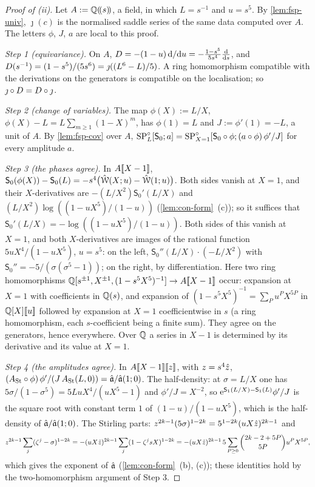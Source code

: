 
\begin{proof}[Proof of (ii)]
Let $A:=\mathbb{Q}(\!(s)\!)$, a field, in which $L=s^{-1}$ and $u=s^5$. By \cref{lem:fsp-univ}, $\jmath(c)$ is the normalised saddle series of the same data computed over $A$. The letters $\phi$, $J$, $a$ are local to this proof.

\emph{Step 1 (equivariance).} On $A$, $D=-(1-u)\,\mathrm{d}/\mathrm{d} u=-\frac{1-s^5}{5s^4}\frac{\mathrm{d}}{\mathrm{d} s}$, and $D(s^{-1})=(1-s^5)/(5s^6)=\jmath((L^6-L)/5)$. A ring homomorphism compatible with the derivations on the generators is compatible on the localisation; so $\jmath\circ D=D\circ\jmath$.

\emph{Step 2 (change of variables).} The map $\phi(X):=L/X$, $\phi(X)-L=L\sum_{m\geq1}(1-X)^m$, has $\phi(1)=L$ and $J:=\phi'(1)=-L$, a unit of $A$. By \cref{lem:fsp-cov} over $A$, $\mathrm{SP}^{\circ}_L[\mathsf S_0;a]=\mathrm{SP}^{\circ}_{X=1}[\mathsf S_0\circ\phi;(a\circ\phi)\,\phi'/J]$ for every amplitude $a$.

\emph{Step 3 (the phases agree).} In $A[\![ X-1 ]\!]$, $\mathsf S_0(\phi(X))-\mathsf S_0(L)=-s^4\bigl(\hat{\mathcal{W}}(X;u)-\hat{\mathcal{W}}(1;u)\bigr)$. Both sides vanish at $X=1$, and their $X$-derivatives are $-(L/X^2)\mathsf S_0'(L/X)$ and $(L/X^2)\log((1-uX^5)/(1-u))$ (\cref{lem:con-form}~(c)); so it suffices that $\mathsf S_0'(L/X)=-\log((1-uX^5)/(1-u))$. Both sides of this vanish at $X=1$, and both $X$-derivatives are images of the rational function $5uX^4/(1-uX^5)$, $u=s^5$: on the left, $\mathsf S_0''(L/X)\cdot(-L/X^2)$ with $\mathsf S_0''=-5/(\sigma(\sigma^5-1))$; on the right, by differentiation. Here two ring homomorphisms $\mathbb{Q}[s^{\pm1},X^{\pm1},(1-s^5X^5)^{-1}]\to A[\![ X-1 ]\!]$ occur: expansion at $X=1$ with coefficients in $\mathbb{Q}(s)$, and expansion of $(1-s^5X^5)^{-1}=\sum_Pu^PX^{5P}$ in $\mathbb{Q}[X][\![ u ]\!]$ followed by expansion at $X=1$ coefficientwise in $s$ (a ring homomorphism, each $s$-coefficient being a finite sum). They agree on the generators, hence everywhere. Over $\mathbb{Q}$ a series in $X-1$ is determined by its derivative and its value at $X=1$.

\emph{Step 4 (the amplitudes agree).} In $A[\![ X-1 ]\!][\![ z ]\!]$, with $z=s^4\hat{z}$, $(A_{\mathrm{St}}\circ\phi)\,\phi'/(J\,A_{\mathrm{St}}(L,0))=\hat{\mathfrak{a}}/\hat{\mathfrak{a}}(1;0)$. The half-density: at $\sigma=L/X$ one has $5\sigma/(1-\sigma^5)=5LuX^4/(uX^5-1)$ and $\phi'/J=X^{-2}$, so $\mathrm{e}^{\mathsf S_1(L/X)-\mathsf S_1(L)}\phi'/J$ is the square root with constant term $1$ of $(1-u)/(1-uX^5)$, which is the half-density of $\hat{\mathfrak{a}}/\hat{\mathfrak{a}}(1;0)$. The Stirling parts: $z^{2k-1}(5\sigma)^{1-2k}=5^{1-2k}(uX\hat{z})^{2k-1}$ and
\[
z^{2k-1}\sum_j(\zeta^j-\sigma)^{1-2k}=-(uX\hat{z})^{2k-1}\sum_j(1-\zeta^jsX)^{1-2k}=-(uX\hat{z})^{2k-1}\,5\sum_{P\geq0}\binom{2k-2+5P}{5P}u^PX^{5P},
\]
which gives the exponent of $\hat{\mathfrak{a}}$ (\cref{lem:con-form}~(b), (c)); these identities hold by the two-homomorphism argument of Step 3.


\end{proof}
